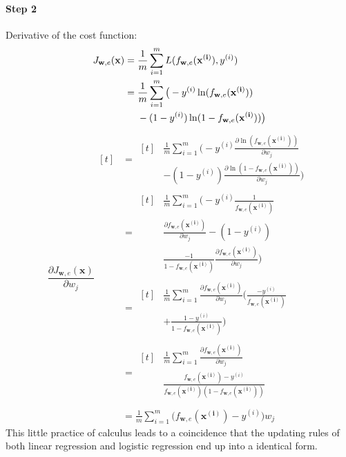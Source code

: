 \documentclass[12pt, twoside]{article}
\begin{document}
\begin{multicols*}{2}
		\paragraph{Step 2} Derivative of the cost function:
		$$
			J_{\mathbf{w},e}(\mathbf{x})
			\begin{aligned}[t]
			 	&=\frac{1}{m}\sum_{i=1}^{m}L(f_{\mathbf{w},e}(\mathbf{x^{(i)}}),y^{(i)}) \\
				&=\begin{aligned}[t]
					&\frac{1}{m}\sum_{i=1}^{m}\big(-y^{(i)}\ln(f_{\mathbf{w},e}(\mathbf{x^{(i)}})) \\
					&-(1-y^{(i)})\ln(1 - f_{\mathbf{w},e}(\mathbf{x^{(i)}}))\big)
				\end{aligned}
			\end{aligned}\\
		$$
		$$
			\frac{\partial J_{\mathbf{w},e}(\mathbf{x})}{\partial w_j}
			\begin{aligned}[t]
				&=\begin{aligned}[t]
					&\frac{1}{m}\sum_{i=1}^{m}\bigg(-y^{(i)}\frac{\partial\ln(f_{\mathbf{w},e}(\mathbf{x^{(i)}}))}{\partial w_j} \\
					&-(1-y^{(i)})\frac{\partial\ln(1 - f_{\mathbf{w},e}(\mathbf{x^{(i)}}))}{\partial w_j}\bigg)
				\end{aligned}\\
				&=\begin{aligned}[t]
					&\frac{1}{m}\sum_{i=1}^{m}\bigg(
					-y^{(i)}\frac{1}{f_{\mathbf{w},e}(\mathbf{x^{(i)}})}\\
					&\frac{\partial f_{\mathbf{w},e}(\mathbf{x^{(i)}})}{\partial w_j}-(1-y^{(i)})\\
					&\frac{-1}{1 - f_{\mathbf{w},e}(\mathbf{x^{(i)}})}
					\frac{\partial f_{\mathbf{w},e}(\mathbf{x^{(i)}})}{\partial w_j}\bigg)
				\end{aligned}\\
				&=\begin{aligned}[t]
					&\frac{1}{m}\sum_{i=1}^{m}
					\frac{\partial f_{\mathbf{w},e}(\mathbf{x^{(i)}})}{\partial w_j}\bigg(
					\frac{-y^{(i)}}{f_{\mathbf{w},e}(\mathbf{x^{(i)}})}\\
					&+\frac{1-y^{(i)}}{1 - f_{\mathbf{w},e}(\mathbf{x^{(i)}})}\bigg)
				\end{aligned}\\
				&=\begin{aligned}[t]
					&\frac{1}{m}\sum_{i=1}^{m}
					\frac{\partial f_{\mathbf{w},e}(\mathbf{x^{(i)}})}{\partial w_j}\\
					&\frac{f_{\mathbf{w},e}(\mathbf{x^{(i)}})-y^{(i)}}{f_{\mathbf{w},e}(\mathbf{x^{(i)}})(1 - f_{\mathbf{w},e}(\mathbf{x^{(i)}}))}\\
				\end{aligned}\\
				&=\frac{1}{m}\sum_{i=1}^{m}\big(
					f_{\mathbf{w},e}(\mathbf{x^{(i)}})-y^{(i)}
					\big)w_j
			\end{aligned}
		$$
		This little practice of calculus leads to a coincidence that the updating rules of both linear regression and logistic regression end up into a identical form.
		

\end{multicols*}
\end{document}
